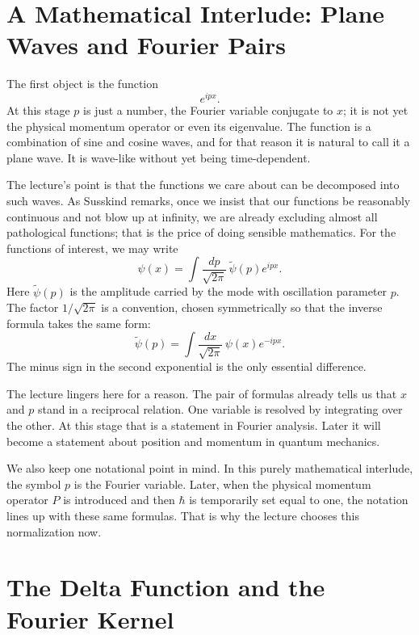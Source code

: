 \section{A Mathematical Interlude: Plane Waves and Fourier Pairs}

The first object is the function
\begin{equation}
e^{ipx}.
\end{equation}
At this stage $p$ is just a number, the Fourier variable conjugate to $x$; it is not yet the physical momentum operator or even its eigenvalue. The function is a combination of sine and cosine waves, and for that reason it is natural to call it a plane wave. It is wave-like without yet being time-dependent.

The lecture's point is that the functions we care about can be decomposed into such waves. As Susskind remarks, once we insist that our functions be reasonably continuous and not blow up at infinity, we are already excluding almost all pathological functions; that is the price of doing sensible mathematics. For the functions of interest, we may write
\begin{equation}
\psi(x)=\int \frac{dp}{\sqrt{2\pi}}\,\widetilde{\psi}(p)e^{ipx}.
\end{equation}
Here $\widetilde{\psi}(p)$ is the amplitude carried by the mode with oscillation parameter $p$. The factor $1/\sqrt{2\pi}$ is a convention, chosen symmetrically so that the inverse formula takes the same form:
\begin{equation}
\widetilde{\psi}(p)=\int \frac{dx}{\sqrt{2\pi}}\,\psi(x)e^{-ipx}.
\end{equation}
The minus sign in the second exponential is the only essential difference.

The lecture lingers here for a reason. The pair of formulas already tells us that $x$ and $p$ stand in a reciprocal relation. One variable is resolved by integrating over the other. At this stage that is a statement in Fourier analysis. Later it will become a statement about position and momentum in quantum mechanics.

We also keep one notational point in mind. In this purely mathematical interlude, the symbol $p$ is the Fourier variable. Later, when the physical momentum operator $P$ is introduced and then $\hbar$ is temporarily set equal to one, the notation lines up with these same formulas. That is why the lecture chooses this normalization now.

\section{The Delta Function and the Fourier Kernel}

